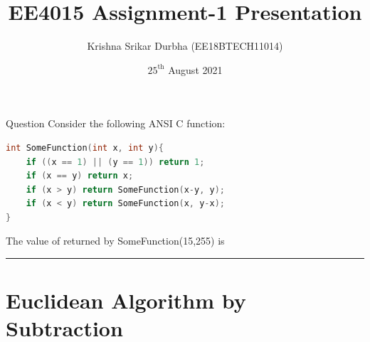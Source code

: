\documentclass[8pt]{beamer}
\title[Report]{EE4015 Assignment-1 Presentation}
\author{Krishna Srikar Durbha (EE18BTECH11014)}
\date{$25^{\text{th}}$ August 2021}
\begin{document}
\begin{frame}
  \titlepage
\end{frame}

\begin{frame}[fragile]{Question}
Consider the following ANSI C function:
\begin{lstlisting}[language=C]
int SomeFunction(int x, int y){
	if ((x == 1) || (y == 1)) return 1;
	if (x == y) return x;
	if (x > y) return SomeFunction(x-y, y);
	if (x < y) return SomeFunction(x, y-x);
}
\end{lstlisting}
The value of returned by SomeFunction(15,255) is \rule{1cm}{0.15mm}
\end{frame}

\section{Euclidean Algorithm by Subtraction}
\end{document}
